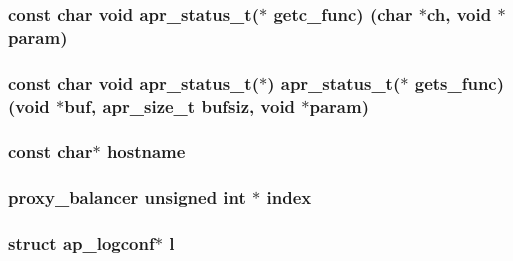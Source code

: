 \subsubsection[{\texorpdfstring{getc\+\_\+func}{getc_func}}]{\setlength{\rightskip}{0pt plus 5cm}const char {\bf void} {\bf apr\+\_\+status\+\_\+t}($\ast$ getc\+\_\+func) (char $\ast$ch, {\bf void} $\ast${\bf param})}\hypertarget{group__APACHE__CORE__CONFIG_ga91b9b6fa16765d274a6c00b1a9de522b}{}\label{group__APACHE__CORE__CONFIG_ga91b9b6fa16765d274a6c00b1a9de522b}
\subsubsection[{\texorpdfstring{gets\+\_\+func}{gets_func}}]{\setlength{\rightskip}{0pt plus 5cm}const char {\bf void} {\bf apr\+\_\+status\+\_\+t}($\ast$) {\bf apr\+\_\+status\+\_\+t}($\ast$ gets\+\_\+func) ({\bf void} $\ast${\bf buf}, {\bf apr\+\_\+size\+\_\+t} {\bf bufsiz}, {\bf void} $\ast${\bf param})}\hypertarget{group__APACHE__CORE__CONFIG_ga69dfd598eb3b30252867672fb5c422c8}{}\label{group__APACHE__CORE__CONFIG_ga69dfd598eb3b30252867672fb5c422c8}
\subsubsection[{\texorpdfstring{hostname}{hostname}}]{\setlength{\rightskip}{0pt plus 5cm}const char$\ast$ hostname}\hypertarget{group__APACHE__CORE__CONFIG_gaad01339e89106fdf68f57ef118956fa9}{}\label{group__APACHE__CORE__CONFIG_gaad01339e89106fdf68f57ef118956fa9}
\subsubsection[{\texorpdfstring{index}{index}}]{ {\bf proxy\+\_\+balancer} unsigned {\bf int} $\ast$ index}\hypertarget{group__APACHE__CORE__CONFIG_ga186c402ad812159f19596ff36a42bf20}{}\label{group__APACHE__CORE__CONFIG_ga186c402ad812159f19596ff36a42bf20}
\subsubsection[{\texorpdfstring{l}{l}}]{\setlength{\rightskip}{0pt plus 5cm}struct {\bf ap\+\_\+logconf}$\ast$ l}\hypertarget{group__APACHE__CORE__CONFIG_ga325499caccf210ef36b605bae60930b7}{}\label{group__APACHE__CORE__CONFIG_ga325499caccf210ef36b605bae60930b7}
